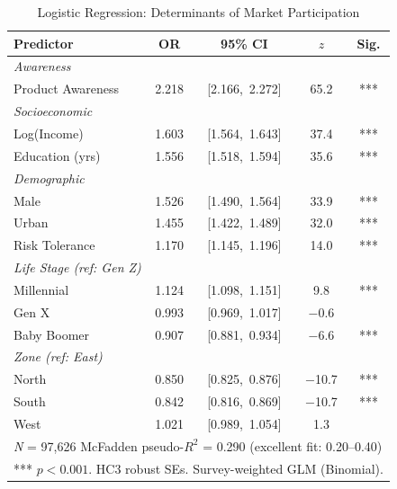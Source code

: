 \documentclass[conference]{IEEEtran}
\begin{document}
\begin{table}[htbp]
\caption{Logistic Regression: Determinants of Market Participation}
\label{tab:logit}
\centering
\begin{tabular}{lcccc}
\toprule
\textbf{Predictor} & \textbf{OR} & \textbf{95\% CI} & \textbf{$z$} & \textbf{Sig.} \\
\midrule
\multicolumn{5}{l}{\textit{Awareness}} \\
\quad Product Awareness   & 2.218 & [2.166,\ 2.272] & 65.2 & *** \\
\midrule
\multicolumn{5}{l}{\textit{Socioeconomic}} \\
\quad Log(Income)         & 1.603 & [1.564,\ 1.643] & 37.4 & *** \\
\quad Education (yrs)     & 1.556 & [1.518,\ 1.594] & 35.6 & *** \\
\midrule
\multicolumn{5}{l}{\textit{Demographic}} \\
\quad Male                & 1.526 & [1.490,\ 1.564] & 33.9 & *** \\
\quad Urban               & 1.455 & [1.422,\ 1.489] & 32.0 & *** \\
\quad Risk Tolerance      & 1.170 & [1.145,\ 1.196] & 14.0 & *** \\
\midrule
\multicolumn{5}{l}{\textit{Life Stage (ref: Gen Z)}} \\
\quad Millennial          & 1.124 & [1.098,\ 1.151] &  9.8 & *** \\
\quad Gen X               & 0.993 & [0.969,\ 1.017] & $-$0.6 & \phantom{***} \\
\quad Baby Boomer         & 0.907 & [0.881,\ 0.934] & $-$6.6 & *** \\
\midrule
\multicolumn{5}{l}{\textit{Zone (ref: East)}} \\
\quad North               & 0.850 & [0.825,\ 0.876] & $-$10.7 & *** \\
\quad South               & 0.842 & [0.816,\ 0.869] & $-$10.7 & *** \\
\quad West                & 1.021 & [0.989,\ 1.054] &   1.3 & \phantom{***} \\
\midrule
\multicolumn{5}{l}{\textit{N} = 97,626 \quad McFadden pseudo-$R^2$ = 0.290 (excellent fit: 0.20--0.40)} \\
\multicolumn{5}{l}{*** $p < 0.001$. HC3 robust SEs. Survey-weighted GLM (Binomial).} \\
\bottomrule
\end{tabular}
\end{table}
\end{document}
